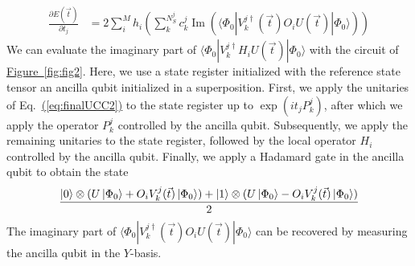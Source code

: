 \documentclass[superscriptaddress,aps,pra,twocolumn,nofootinbib,babel]{revtex4-1}
\newcommand{\eq}[1]{Eq.~\hyperref[eq:#1]{(\ref*{eq:#1})}}
\newcommand{\fig}[1]{\hyperref[fig:#1]{Figure~\ref*{fig:#1}}}
\def\ket#1{\mathinner{|{#1}\rangle}}
\newcommand{\jarrod}[1]{{\color{magenta}{#1}}}
\begin{document}
\begin{align}\label{eq:finalderivative}
\frac{\partial E(\vec{t})}{\partial t_j} & = 2 \sum^{M}_{i} h_i \left( \sum^{N^{j}_S}_{k} c^j_k \operatorname{Im} (\langle \Phi_0| V^{j\dagger}_{k}(\vec{t}) O_i  U(\vec{t})|\Phi_0\rangle) \right)
\end{align}
We can evaluate the imaginary part of $\langle \Phi_0| V^{j\dagger}_{k} H_i  U(\vec{t})|\Phi_0\rangle$ with the circuit of \fig{fig2}. Here, we use a state register initialized with the reference state tensor an ancilla qubit initialized in a superposition. First, we apply the unitaries of \eq{finalUCC2} to the state register up to $\exp(i t_j P^j_k )$, after which we apply the operator $P^j_k$ controlled by the ancilla qubit. Subsequently, we apply the remaining unitaries to the state register, followed by the local operator $H_i$ controlled by the ancilla qubit. Finally, we apply a Hadamard gate in the ancilla qubit to obtain the state
\begin{align}
\frac{\ket{0}\otimes(U\ket{\Phi_0}+ O_i V^j_k(\vec{t})\ket{\Phi_0}) + \ket{1}\otimes(U\ket{\Phi_0} - O_i V^j_k(\vec{t})\ket{\Phi_0})}{2}
\end{align}
The imaginary part of $\langle \Phi_0| V^{j\dagger}_{k}(\vec{t}) O_i  U(\vec{t})|\Phi_0\rangle$ can be recovered by measuring the ancilla qubit in the $Y$-basis.
\end{document}
